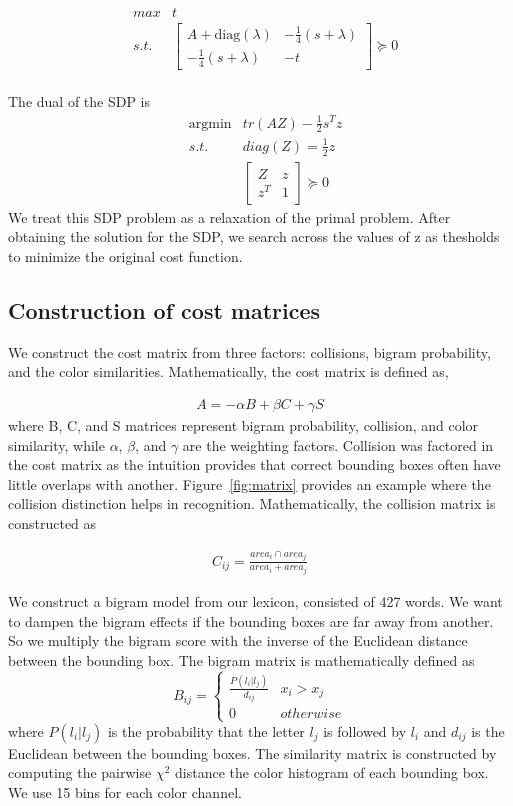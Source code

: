 \documentclass[10pt,twocolumn,letterpaper]{article}
\begin{document}
\begin{eqnarray*}
& max & t\\
 & s.t. & \left[\begin{array}{cc}
A+\mbox{diag}(\lambda) & -\frac{1}{4}(s+\lambda)\\
-\frac{1}{4}(s+\lambda) & -t
\end{array}\right]\succeq0
\end{eqnarray*}\\
The dual of the SDP is
\begin{eqnarray*}
 & \mbox{argmin} &  tr(AZ)-\frac{1}{2}s^{T}z\\
 & s.t. & diag(Z)=\frac{1}{2}z\\
 &  & \left[\begin{array}{cc}
Z & z\\
z^{T} & 1
\end{array}\right]\succeq0
\end{eqnarray*}
We treat this SDP problem as a relaxation of the primal problem. After obtaining the solution for the SDP, we search across the values of z as thesholds to minimize the original cost function.
\subsection{Construction of cost matrices}
We construct the cost matrix from three factors: collisions, bigram probability, and the color similarities. Mathematically, the cost matrix is defined as,

\begin{eqnarray*}
A=-\alpha B+\beta C+\gamma S
\end{eqnarray*}
where B, C, and S matrices represent bigram probability, collision, and color similarity, while $\alpha$, $\beta$, and $\gamma$ are the weighting factors.
Collision was factored in the cost matrix as the intuition provides that correct bounding boxes often have little overlaps with another. Figure~\ref{fig:matrix} provides an example where the collision distinction helps in recognition. Mathematically, the collision matrix is constructed as 

\begin{eqnarray*}
C_{ij}=\frac{area_{i}\cap area_{j}}{area_{i}+area_{j}}
\end{eqnarray*}

We construct a bigram model from our lexicon, consisted of 427 words. We want to dampen the bigram effects if the bounding boxes are far away from another. So we multiply the bigram score with the inverse of the Euclidean distance between the bounding box. The bigram matrix is mathematically defined as
\[
B_{ij}=\begin{cases}
\frac{P(l_{i}|l_{j})}{d_{ij}} & x_{i}>x_{j}\\
0 & otherwise
\end{cases}
\]
where $P(l_{i}|l_{j})$ is the probability that the letter $l_{j}$ is followed by $l_{i}$ and $d_{ij}$ is the Euclidean between the bounding boxes. The similarity matrix is constructed by computing the pairwise $\chi^2$ distance the color histogram of each bounding box. We use 15 bins for each color channel.
\end{document}
